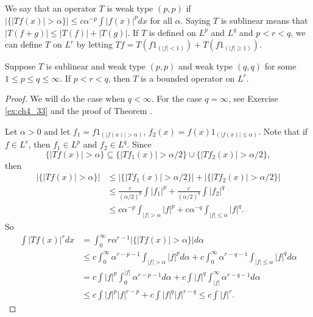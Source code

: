 
We say that an operator $T$ is weak type $(p,p)$ if $|\{|Tf(x)| > \alpha\}| \leq c\alpha^{-p}\int |f(x)|^pdx$ for all $\alpha$. Saying $T$ is sublinear means that $|T(f + g)| \leq |T(f)| + |T(g)|$. If $T$ is defined on $L^p$ and $L^q$ and $p < r < q$, we can define $T$ on $L^r$ by letting $Tf = T(f1_{(|f|<1)}) + T(f1_{(|f|\geq 1)})$.


\begin{theorem}\label{thm:ch4_7.21}
Suppose $T$ is sublinear and weak type $(p,p)$ and weak type $(q,q)$ for some $1 \leq p \leq q \leq \infty$. If $p < r < q$, then $T$ is a bounded operator on $L^r$.
\end{theorem}

\begin{proof}
We will do the case when $q < \infty$. For the case $q = \infty$, see Exercise \ref{ex:ch4_33} and the proof of Theorem .

\mpagebreak

Let $\alpha > 0$ and let $f_1 = f1_{(|f(x)|>\alpha)}$, $f_2(x) = f(x)1_{(|f(x)|\leq\alpha)}$. Note that if $f \in L^r$, then $f_1 \in L^p$ and $f_2 \in L^q$. Since
\[
    \{|Tf(x)| > \alpha\} \subseteq \{|Tf_1(x)| > \alpha/2\} \cup \{|Tf_2(x)| > \alpha/2\},
\]
then
\begin{align*}
    |\{|Tf(x)| > \alpha\}| &\leq |\{|Tf_1(x)| > \alpha/2\}| + |\{|Tf_2(x)| > \alpha/2\}| \\
    &\leq \frac{c}{(\alpha/2)^p}\int |f_1|^p + \frac{c}{(\alpha/2)^q}\int |f_2|^q \\
    &\leq c\alpha^{-p}\int_{|f|>\alpha} |f|^p + c\alpha^{-q}\int_{|f|\leq\alpha} |f|^q.
\end{align*}
So
\begin{align*}
    \int |Tf(x)|^rdx &= \int_0^\infty r\alpha^{r-1}|\{|Tf(x)| > \alpha\}|d\alpha \\
    &\leq c\int_0^\infty \alpha^{r-p-1}\int_{|f|>\alpha} |f|^pd\alpha + c\int_0^\infty \alpha^{r-q-1}\int_{|f|\leq\alpha} |f|^qd\alpha \\
    &= c\int |f|^p\int_0^{|f|} \alpha^{r-p-1}d\alpha + c\int |f|^q\int_{|f|}^\infty \alpha^{r-q-1}d\alpha \\
    &\leq c\int |f|^p|f|^{r-p} + c\int |f|^q|f|^{r-q} \leq c\int |f|^r.
\end{align*}
\end{proof}

